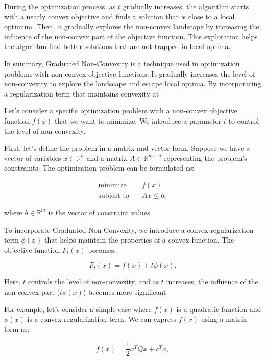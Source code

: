 During the optimization process, as $t$ gradually increases, the algorithm starts with a nearly convex objective and finds a solution that is close to a local optimum. Then, it gradually explores the non-convex landscape by increasing the influence of the non-convex part of the objective function. This exploration helps the algorithm find better solutions that are not trapped in local optima.

In summary, Graduated Non-Convexity is a technique used in optimization problems with non-convex objective functions. It gradually increases the level of non-convexity to explore the landscape and escape local optima. By incorporating a regularization term that maintains convexity at

Let's consider a specific optimization problem with a non-convex objective function $f(x)$ that we want to minimize. We introduce a parameter $t$ to control the level of non-convexity.

First, let's define the problem in a matrix and vector form. Suppose we have a vector of variables $x \in \mathbb{R}^n$ and a matrix $A \in \mathbb{R}^{m \times n}$ representing the problem's constraints. The optimization problem can be formulated as:

\begin{align*}
\text{minimize} & \quad f(x) \\
\text{subject to} & \quad Ax \leq b,
\end{align*}

where $b \in \mathbb{R}^m$ is the vector of constraint values.

To incorporate Graduated Non-Convexity, we introduce a convex regularization term $\phi(x)$ that helps maintain the properties of a convex function. The objective function $F_t(x)$ becomes:

\begin{equation}
	F_t(x) = f(x) + t\phi(x).
\end{equation}


Here, $t$ controls the level of non-convexity, and as $t$ increases, the influence of the non-convex part ($t\phi(x)$) becomes more significant.

For example, let's consider a simple case where $f(x)$ is a quadratic function and $\phi(x)$ is a convex regularization term. We can express $f(x)$ using a matrix form as:

\begin{equation}
	f(x) = \frac{1}{2} x^T Q x + c^T x,
\end{equation}

